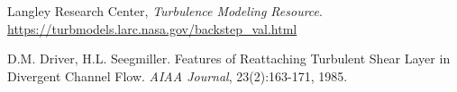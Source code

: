 \documentclass[11pt, a4paper]{article}
\theoremstyle{definition}
\begin{document}
\FloatBarrier
\begin{thebibliography}{99}\label{sec:bib}
	
	 Langley Research Center, \emph{Turbulence Modeling 
	Resource}.\\ 
	\hyperlink{https://turbmodels.larc.nasa.gov/backstep_val.html}{https://turbmodels.larc.nasa.gov/backstep\_val.html}
	
	 D.M. Driver, H.L. Seegmiller. Features of Reattaching 
	Turbulent Shear Layer in Divergent Channel Flow. \emph{AIAA Journal}, 
	23(2):163-171, 1985.
	
\end{thebibliography}
\end{document}
